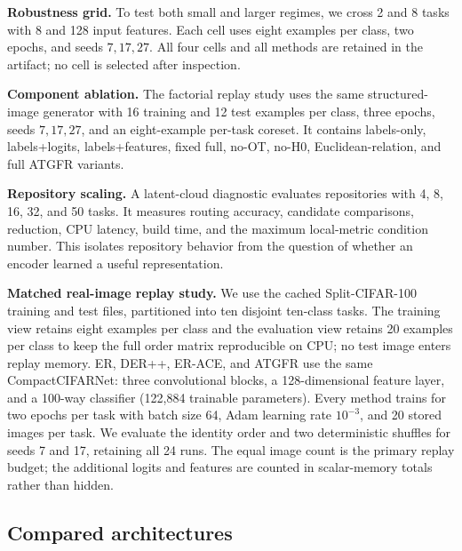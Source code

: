 \documentclass[conference]{IEEEtran}
\newcommand{\ATGFR}{\textsc{ATGFR}}
\begin{document}
\textbf{Robustness grid.} To test both small and larger regimes, we cross
2 and 8 tasks with 8 and 128 input features. Each cell uses eight examples per
class, two epochs, and seeds \(7,17,27\). All four cells and all methods are
retained in the artifact; no cell is selected after inspection.

\textbf{Component ablation.} The factorial replay study uses the same
structured-image generator with 16 training and 12 test examples per class,
three epochs, seeds \(7,17,27\), and an eight-example per-task coreset. It
contains labels-only, labels+logits, labels+features, fixed full, no-OT,
no-H0, Euclidean-relation, and full ATGFR variants.

\textbf{Repository scaling.} A latent-cloud diagnostic evaluates repositories
with 4, 8, 16, 32, and 50 tasks. It measures routing accuracy, candidate
comparisons, reduction, CPU latency, build time, and the maximum local-metric
condition number. This isolates repository behavior from the question of
whether an encoder learned a useful representation.

\textbf{Matched real-image replay study.} We use the cached Split-CIFAR-100
training and test files, partitioned into ten disjoint ten-class tasks. The
training view retains eight examples per class and the evaluation view retains
20 examples per class to keep the full order matrix reproducible on CPU; no
test image enters replay memory. ER, DER++, ER-ACE, and \ATGFR{} use the same
CompactCIFARNet: three convolutional blocks, a 128-dimensional feature layer,
and a 100-way classifier (122,884 trainable parameters). Every method trains
for two epochs per task with batch size 64, Adam learning rate \(10^{-3}\), and
20 stored images per task. We evaluate the identity order and two deterministic
shuffles for seeds 7 and 17, retaining all 24 runs. The equal image count is
the primary replay budget; the additional logits and features are counted in
scalar-memory totals rather than hidden.

\subsection{Compared architectures}
\end{document}

